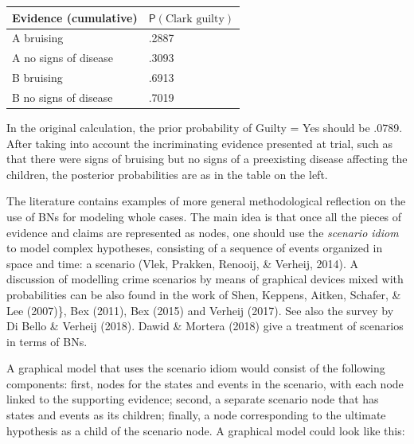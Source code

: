 \documentclass[11pt,dvipsnames,enabledeprecatedfontcommands]{scrartcl}
\newcommand{\pr}[1]{\mathsf{P}(#1)}
\begin{document}
\begin{minipage}[c]{0.4\linewidth}
\begin{table}[H]
\centering
\begin{tabular}{@{}ll@{}}
\toprule
Evidence (cumulative) & $\pr{\textrm{Clark guilty}}$ 
\\ \midrule 
A bruising& .2887\\
A no signs of disease & .3093\\
B bruising & .6913\\
B no signs of disease  & .7019\\
 \bottomrule
\end{tabular}
\end{table}
\end{minipage} \begin{minipage}[c]{0.55\linewidth}
In the  original calculation, the prior probability of \textrm{Guilty = Yes} should be .0789. After taking into account the incriminating evidence presented at trial, such as that there were signs of bruising but no signs of a preexisting disease affecting the children, the posterior probabilities are as in the table on the left.
\end{minipage}

\vspace{2mm}

The literature contains examples of more general methodological
reflection on the use of BNs for modeling whole cases. The main idea is
that once all the pieces of evidence and claims are represented as
nodes, one should use the \textit{scenario idiom} to model complex
hypotheses, consisting of a sequence of events organized in space and
time: a scenario (Vlek, Prakken, Renooij, \& Verheij, 2014). A
discussion of modelling crime scenarios by means of graphical devices
mixed with probabilities can be also found in the work of Shen, Keppens,
Aitken, Schafer, \& Lee (2007)\}, Bex (2011), Bex (2015) and Verheij
(2017). See also the survey by Di Bello \& Verheij (2018). Dawid \&
Mortera (2018) give a treatment of scenarios in terms of BNs.

A graphical model that uses the scenario idiom would consist of the
following components: first, nodes for the states and events in the
scenario, with each node linked to the supporting evidence; second, a
separate scenario node that has states and events as its children;
finally, a node corresponding to the ultimate hypothesis as a child of
the scenario node. A graphical model could look like this:
\end{document}
